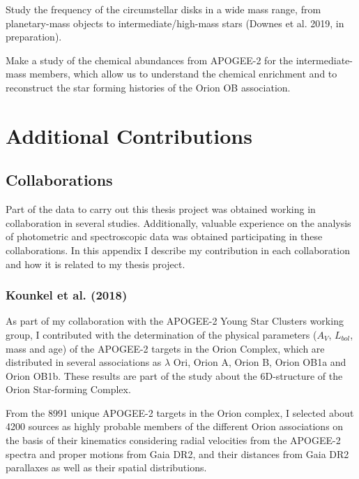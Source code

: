 \documentclass[12pt]{article}
\begin{document}
\begin{itemize}
		Study the frequency of the circumstellar disks in a wide mass range, from planetary-mass objects to intermediate/high-mass stars (Downes et al. 2019, in preparation). \par
		Make a study of the chemical abundances from APOGEE-2 for the intermediate-mass members, which allow us to understand the chemical enrichment and to reconstruct the star forming histories of the Orion OB association.
\end{itemize}

\appendix
\newpage

\section{Additional Contributions}
\label{sec:constributions}

\subsection{Collaborations}
\label{sec:collaborations}
Part of the data to carry out this thesis project was obtained working in collaboration in several studies. Additionally, valuable experience on the analysis of photometric and spectroscopic data was obtained participating in these collaborations. In this appendix I describe my contribution in each collaboration and how it is related to my thesis project.

\subsubsection{Kounkel et al. (2018)}
\label{sec:Kounkel}
As part of my collaboration with the APOGEE-2 Young Star Clusters working group, I contributed with the determination of the physical parameters ($A_V$, $L_{bol}$, mass and age) of the APOGEE-2 targets in the Orion Complex, which are distributed in several associations as $\lambda$ Ori, Orion A, Orion B, Orion OB1a and Orion OB1b. These results are part of the \citet{Kounkel2018} study about the 6D-structure of the Orion Star-forming Complex.

From the 8991 unique APOGEE-2 targets in the Orion complex, I selected about 4200 sources as highly probable members of the different Orion associations on the basis of their kinematics considering radial velocities from the APOGEE-2 spectra \citep{Kounkel2018} and proper motions from Gaia DR2, and their distances from Gaia DR2 parallaxes as well as their spatial distributions.
\end{document}
